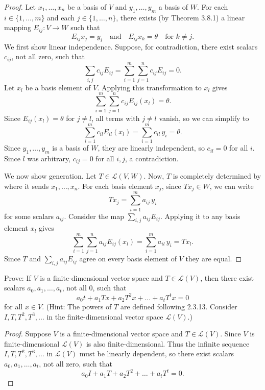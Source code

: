 \begin{proof}
    Let $x_1, \ldots, x_n$ 
    be a basis of $V$ and $y_1, \ldots, y_m$ a basis of $W$. For each $i \in \{1, \ldots, m\}$ 
    and each $j \in \{1, \ldots, n\}$, there exists (by Theorem 3.8.1) a linear mapping 
    $E_{ij} : V \to W$ such that
    \[E_{ij} x_j = y_i \quad \text{and} \quad E_{ij} x_k = \theta \quad \text{for } k \ne j.\]
    We first show linear independence.
    Suppose, for contradiction, there exist scalars $c_{ij}$, not all zero, such that 
    \[\sum_{i,j} c_{ij} E_{ij} = \sum_{i=1}^m \sum_{j=1}^n c_{ij} E_{ij} = 0.\]
    Let $x_l$ be a basis element of $V$.
    Applying this transformation to $x_l$ gives
    \[\sum_{i=1}^m \sum_{j=1}^n c_{ij} E_{ij}(x_l) = \theta.\]
    Since $E_{ij}(x_l) = \theta$ for $j \ne l$, all terms with $j \ne l$ vanish, so we can simplify to
    \[\sum_{i=1}^m c_{il} E_{il}(x_l) = \sum_{i=1}^m c_{il}\, y_i = \theta.\]
    Since $y_1, \ldots, y_m$ is a basis of $W$, they are linearly independent, so $c_{il} = 0$ for all $i$.
    Since $l$ was arbitrary, $c_{ij} = 0$ for all $i, j$, a contradiction.
    
    We now show generation.
    Let $T \in \mathcal{L}(V, W)$.
    Now, $T$ is completely determined by where it sends $x_1, \ldots, x_n$.
    For each basis element $x_j$, since $Tx_j \in W$, we can write
    \[T x_j = \sum_{i=1}^m a_{ij}\, y_i\]
    for some scalars $a_{ij}$. Consider the map $\sum_{i,j} a_{ij} E_{ij}$.
    Applying it to any basis element $x_l$ gives
    \[\sum_{i=1}^m \sum_{j=1}^n a_{ij} E_{ij}(x_l) = \sum_{i=1}^m a_{il}\, y_i = T x_l.\]
    Since $T$ and $\sum_{i,j} a_{ij} E_{ij}$ agree on every basis element of $V$ they are equal.
\end{proof}

\begin{tcolorbox}[title=Exercise 7, breakable]
    Prove: If $V$ is a finite-dimensional vector space and $T \in \mathcal{L}(V)$, then 
    there exist scalars $a_0, a_1, \ldots, a_t$, not all 0, such that 
    \[a_0 t + a_1 Tx + a_2 T^2 x + \ldots + a_t T^t x = 0\]
    for all $x \in V$. (Hint: The powers of $T$ are defined following 2.3.13. 
    Consider $I, T, T^2, T^3, \ldots$ in the finite-dimensional vector space $\mathcal{L}(V)$.)
\end{tcolorbox}

\begin{proof}
    Suppose $V$ is a finite-dimensional vector space and $T \in \mathcal{L}(V)$.
    Since $V$ is finite-dimensional $\mathcal{L}(V)$ is also finite-dimensional.
    Thus the infinite sequence $I, T, T^2, T^3, \ldots$ in $\mathcal{L}(V)$ must be 
    linearly dependent, so there exist scalars $a_0, a_1, \ldots, a_t$, not all zero, such that
    \[a_0 I + a_1 T + a_2 T^2 + \ldots + a_t T^t = 0.\]
\end{proof}

